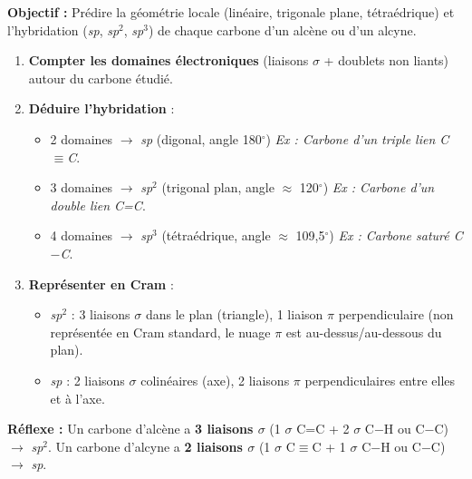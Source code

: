 \documentclass[11pt]{article}
\begin{document}
\begin{methode}
\textbf{Objectif :} Prédire la géométrie locale (linéaire, trigonale plane, tétraédrique) et l'hybridation (\textit{sp}, \textit{sp}$^2$, \textit{sp}$^3$) de chaque carbone d'un alcène ou d'un alcyne.

\begin{enumerate}
    \item \textbf{Compter les domaines électroniques} (liaisons $\sigma$ + doublets non liants) autour du carbone étudié.
    \item \textbf{Déduire l'hybridation} :
        \begin{itemize}
            \item 2 domaines $\rightarrow$ \textit{sp} (digonal, angle 180$^\circ$) \quad \textit{Ex : Carbone d'un triple lien C$\equiv$C}.
            \item 3 domaines $\rightarrow$ \textit{sp}$^2$ (trigonal plan, angle $\approx$ 120$^\circ$) \quad \textit{Ex : Carbone d'un double lien C=C}.
            \item 4 domaines $\rightarrow$ \textit{sp}$^3$ (tétraédrique, angle $\approx$ 109,5$^\circ$) \quad \textit{Ex : Carbone saturé C$-$C}.
        \end{itemize}
    \item \textbf{Représenter en Cram} : 
        \begin{itemize}
            \item \textit{sp}$^2$ : 3 liaisons $\sigma$ dans le plan (triangle), 1 liaison $\pi$ perpendiculaire (non représentée en Cram standard, le nuage $\pi$ est au-dessus/au-dessous du plan).
            \item \textit{sp} : 2 liaisons $\sigma$ colinéaires (axe), 2 liaisons $\pi$ perpendiculaires entre elles et à l'axe.
        \end{itemize}
\end{enumerate}
\textbf{Réflexe :} Un carbone d'alcène a \textbf{3 liaisons $\sigma$} (1 $\sigma$ C=C + 2 $\sigma$ C$-$H ou C$-$C) $\rightarrow$ \textit{sp}$^2$. Un carbone d'alcyne a \textbf{2 liaisons $\sigma$} (1 $\sigma$ C$\equiv$C + 1 $\sigma$ C$-$H ou C$-$C) $\rightarrow$ \textit{sp}.
\end{methode}
\end{document}
